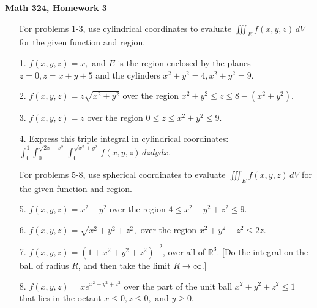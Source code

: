 \documentclass[11 pt]{report}
\begin{document}
\centerline{\bf Math 324, Homework 3}


\vspace{.2cm}

\begin{enumerate} \item[] For problems 1-3, use cylindrical coordinates to evaluate $\displaystyle \iiint_E f(x,y,z)\, dV$ for the given function and region.

\item[1.] $f(x,y,z) = x,$ and $E$ is the region enclosed by the planes $z = 0, z = x+y+5$ and the cylinders $x^2+y^2 = 4, x^2 + y^2 = 9$. 
 
\item[2.] $f(x,y,z) = z \sqrt{x^2+y^2}$ over the region $x^2+y^2 \leq z \leq 8 - (x^2+y^2)$. 

\item[3.] $f(x,y,z) = z$ over the region $0 \leq z \leq x^2+y^2 \leq 9$. 

\end{enumerate}

\begin{enumerate} \item[4.] Express this triple integral in cylindrical coordinates: $\displaystyle \int_0^1 \int_0^{\sqrt{2x-x^2}} \int_0^{\sqrt{x^2+y^2}} f(x,y,z) \, dz dy dx.$ \end{enumerate}

\begin{enumerate} \item[] For problems 5-8, use spherical coordinates to evaluate $\displaystyle \iiint_E f(x,y,z)\, dV$ for the given function and region. 

\item[5.] $f(x,y,z) = x^2 + y^2$ over the region $4 \leq x^2+y^2+z^2 \leq 9.$ 

\item[6.] $f(x,y,z) = \sqrt{x^2+y^2+z^2},$ over the region $x^2+y^2+z^2 \leq 2z$. 

\item[7.] $f(x,y,z) = (1+x^2+y^2+z^2)^{-2}$, over all of $\mathbb{R}^3$. [Do the integral on the ball of radius $R$, and then take the limit $R \to \infty$.]

\item[8.] $f(x,y,z) = x e^{x^2+y^2+z^2}$ over the part of the unit ball $x^2+y^2+z^2 \leq 1$ that lies in the octant $x \leq 0, z \leq 0,$ and $ y \geq 0$. 
\end{enumerate} 
\end{document}
